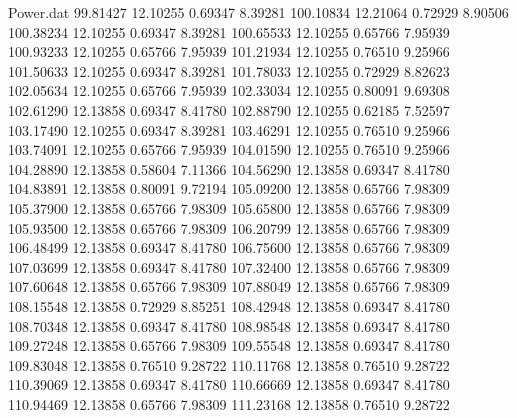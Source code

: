 \begin{filecontents}{Power.dat}
  99.81427   12.10255    0.69347    8.39281
 100.10834   12.21064    0.72929    8.90506
 100.38234   12.10255    0.69347    8.39281
 100.65533   12.10255    0.65766    7.95939
 100.93233   12.10255    0.65766    7.95939
 101.21934   12.10255    0.76510    9.25966
 101.50633   12.10255    0.69347    8.39281
 101.78033   12.10255    0.72929    8.82623
 102.05634   12.10255    0.65766    7.95939
 102.33034   12.10255    0.80091    9.69308
 102.61290   12.13858    0.69347    8.41780
 102.88790   12.10255    0.62185    7.52597
 103.17490   12.10255    0.69347    8.39281
 103.46291   12.10255    0.76510    9.25966
 103.74091   12.10255    0.65766    7.95939
 104.01590   12.10255    0.76510    9.25966
 104.28890   12.13858    0.58604    7.11366
 104.56290   12.13858    0.69347    8.41780
 104.83891   12.13858    0.80091    9.72194
 105.09200   12.13858    0.65766    7.98309
 105.37900   12.13858    0.65766    7.98309
 105.65800   12.13858    0.65766    7.98309
 105.93500   12.13858    0.65766    7.98309
 106.20799   12.13858    0.65766    7.98309
 106.48499   12.13858    0.69347    8.41780
 106.75600   12.13858    0.65766    7.98309
 107.03699   12.13858    0.69347    8.41780
 107.32400   12.13858    0.65766    7.98309
 107.60648   12.13858    0.65766    7.98309
 107.88049   12.13858    0.65766    7.98309
 108.15548   12.13858    0.72929    8.85251
 108.42948   12.13858    0.69347    8.41780
 108.70348   12.13858    0.69347    8.41780
 108.98548   12.13858    0.69347    8.41780
 109.27248   12.13858    0.65766    7.98309
 109.55548   12.13858    0.69347    8.41780
 109.83048   12.13858    0.76510    9.28722
 110.11768   12.13858    0.76510    9.28722
 110.39069   12.13858    0.69347    8.41780
 110.66669   12.13858    0.69347    8.41780
 110.94469   12.13858    0.65766    7.98309
 111.23168   12.13858    0.76510    9.28722
\end{filecontents}
